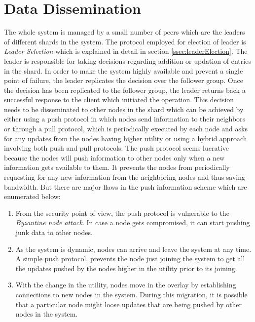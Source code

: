 \documentclass[a4paper,11pt]{kth-mag}
\begin{document}
\section{Data Dissemination}
\label{sec:pull}

The whole system is managed by a small number of peers which are the leaders of different shards in the system. The protocol employed for election of leader is \textit{Leader Selection} which is explained in detail in section \ref{ssec:leaderElection}. The leader is responsible for taking decisions regarding addition or updation of entries in the shard. In order to make the system highly available and prevent a single point of failure, the leader replicates the decision over the follower group. Once the decision has been replicated to the follower group, the leader returns back a successful response to the client which initiated the operation. This decision needs to be disseminated to other nodes in the shard which can be achieved by either using a push protocol in which nodes send information to their neighbors or through a pull protocol, which is periodically executed by each node and asks for any updates from the nodes having higher utility or using a hybrid approach involving both push and pull protocols. The push protocol seems lucrative because the nodes will push information to other nodes only when a new information gets available to them. It prevents the nodes from periodically requesting for any new information from the neighboring nodes and thus saving bandwidth. But there are major flaws in the push information scheme which are enumerated below:

\begin{enumerate}

\item From the security point of view, the push protocol is vulnerable to the \textit{Byzantine node attack}. In case a node gets compromised, it can start pushing junk data to other nodes.

\item As the system is dynamic, nodes can arrive and leave the system at any time. A simple push protocol, prevents the node just joining the system to get all the updates pushed by the nodes higher in the utility prior to its joining.

\item With the change in the utility, nodes move in the overlay by establishing connections to new nodes in the system. During this migration, it is possible that a particular node might loose updates that are being pushed by other nodes in the system.

\end{enumerate}
\end{document}
